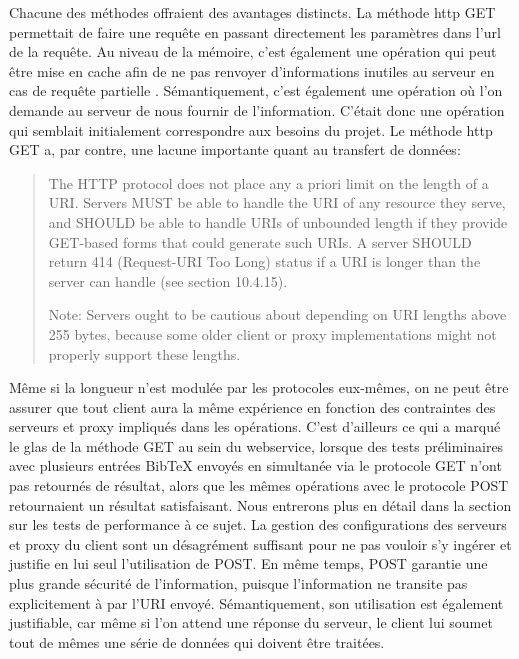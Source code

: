 \documentclass[12pt,titlepage]{article}
\begin{document}
Chacune des méthodes offraient des avantages distincts. La méthode http GET permettait de faire une requête en passant directement les paramètres dans l'url de la requête. Au niveau de la mémoire, c'est également une opération qui peut être mise en cache afin de ne pas renvoyer d'informations inutiles au serveur en cas de requête partielle \cite{w3b}. Sémantiquement, c'est également une opération où l'on demande au serveur de nous fournir de l'information. C'était donc une opération qui semblait initialement correspondre aux besoins du projet. Le méthode http GET a, par contre, une lacune importante quant au transfert de données:

\blockquote {The HTTP protocol does not place any a priori limit on the length of a URI. Servers MUST be able to handle the URI of any resource they serve, and SHOULD be able to handle URIs of unbounded length if they provide GET-based forms that could generate such URIs. A server SHOULD return 414 (Request-URI Too Long) status if a URI is longer than the server can handle (see section 10.4.15).

      Note: Servers ought to be cautious about depending on URI lengths
      above 255 bytes, because some older client or proxy
      implementations might not properly support these lengths. \cite{w3c}
      } 
      
Même si la longueur n'est modulée par les protocoles eux-mêmes, on ne peut être assurer que tout client aura la même expérience en fonction des contraintes des serveurs et proxy impliqués dans les opérations. C'est d'ailleurs ce qui a marqué le glas de la méthode GET au sein du webservice, lorsque des tests préliminaires avec plusieurs entrées BibTeX envoyés en simultanée via le protocole GET n'ont pas retournés de résultat, alors que les mêmes opérations avec le protocole POST retournaient un résultat satisfaisant. Nous entrerons plus en détail dans la section sur les tests de performance à ce sujet. La gestion des configurations des serveurs et proxy du client sont un désagrément suffisant pour ne pas vouloir s'y ingérer et justifie en lui seul l'utilisation de POST. En même temps, POST garantie une plus grande sécurité de l'information, puisque l'information ne transite pas explicitement à par l'URI envoyé. \cite{w3a} Sémantiquement, son utilisation est également justifiable, car même si l'on attend une réponse du serveur, le client lui soumet tout de mêmes une série de données qui doivent être traitées. \newline
\end{document}
